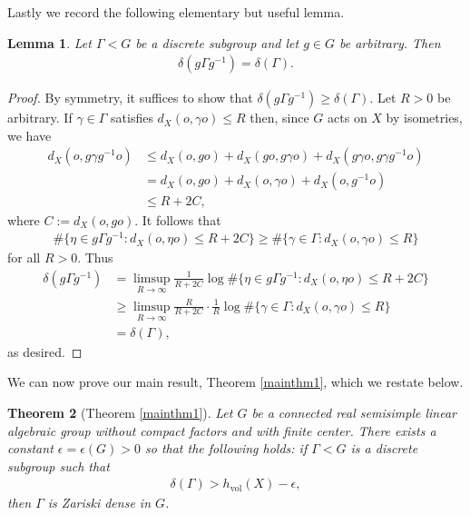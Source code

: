 \documentclass[psamsfonts]{amsart}
\newtheorem{thm}{Theorem}[section]
\newtheorem{lem}[thm]{Lemma}
\theoremstyle{definition}
\theoremstyle{remark}
\numberwithin{equation}{section}
\begin{document}
Lastly we record the following elementary but useful lemma.
\begin{lem}
\label{invariantunderconjugation}
Let $\Gamma < G$ be a discrete subgroup and let $g \in G$ be arbitrary. Then
\begin{align*}
\delta(g \Gamma g^{-1}) = \delta (\Gamma).
\end{align*}
\end{lem}
\begin{proof}
By symmetry, it suffices to show that $\delta(g \Gamma g^{-1}) \geq \delta (\Gamma)$. Let $R > 0$ be arbitrary. If $\gamma \in \Gamma$ satisfies $d_{X}(o, \gamma o) \leq R$ then, since $G$ acts on $X$ by isometries, we have
\begin{align*}
d_{X}(o, g \gamma g^{-1} o) &\leq d_{X}(o, go) + d_{X}(go, g \gamma o) + d_{X}(g \gamma o, g \gamma g^{-1} o) \\
&= d_{X}(o, go) + d_{X}(o, \gamma o) + d_{X}(o, g^{-1} o) \\
&\leq R+2C,
\end{align*} where $C := d_{X}(o, go)$. It follows that
\begin{align*}
\# \{\eta \in g \Gamma g^{-1} : d_{X}(o, \eta o) \leq R+2C \} \geq \# \{ \gamma \in \Gamma : d_{X}(o, \gamma o) \leq R \}
\end{align*} for all $R > 0$. Thus
\begin{align*}
\delta (g \Gamma g^{-1}) &= \limsup_{R \to \infty} \frac{1}{R+2C} \log \# \{\eta \in g \Gamma g^{-1} : d_{X}(o, \eta o) \leq R+2C \} \\
&\geq \limsup_{R \to \infty} \frac{R}{R+2C} \cdot \frac{1}{R} \log \# \{ \gamma \in \Gamma : d_{X}(o, \gamma o) \leq R \} \\
&= \delta(\Gamma),
\end{align*} as desired.
\end{proof} 
We can now prove our main result, Theorem \ref{mainthm1}, which we restate below.
\begin{thm} [Theorem \ref{mainthm1}]
\label{mainthm2}
Let $G$ be a connected real semisimple linear algebraic group without compact factors and with finite center. There exists a constant $\epsilon = \epsilon(G) > 0$ so that the following holds: if $\Gamma < G$ is a discrete subgroup such that
\begin{align*}
\delta(\Gamma) > h_{\mathrm{vol}}(X) - \epsilon,
\end{align*} then $\Gamma$ is Zariski dense in $G$.
\end{thm}
\end{document}
